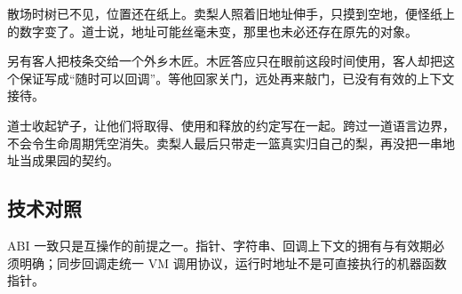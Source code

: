 散场时树已不见，位置还在纸上。卖梨人照着旧地址伸手，只摸到空地，便怪纸上的数字变了。道士说，地址可能丝毫未变，那里也未必还存在原先的对象。

另有客人把枝条交给一个外乡木匠。木匠答应只在眼前这段时间使用，客人却把这个保证写成“随时可以回调”。等他回家关门，远处再来敲门，已没有有效的上下文接待。

道士收起铲子，让他们将取得、使用和释放的约定写在一起。跨过一道语言边界，不会令生命周期凭空消失。卖梨人最后只带走一篮真实归自己的梨，再没把一串地址当成果园的契约。

\subsection*{技术对照}

ABI 一致只是互操作的前提之一。指针、字符串、回调上下文的拥有与有效期必须明确；同步回调走统一 VM 调用协议，运行时地址不是可直接执行的机器函数指针。
